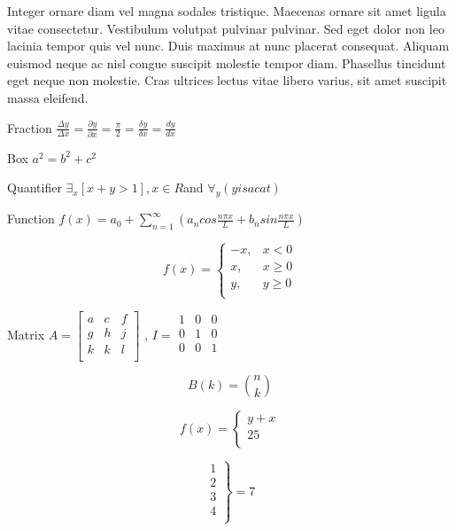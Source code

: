 \documentclass{book}
\begin{document}
Integer ornare diam vel magna sodales tristique. Maecenas ornare sit amet ligula vitae consectetur. Vestibulum volutpat pulvinar pulvinar. Sed eget dolor non leo lacinia tempor quis vel nunc. Duis maximus at nunc placerat consequat. Aliquam euismod neque ac nisl congue suscipit molestie tempor diam. Phasellus tincidunt eget neque non molestie. Cras ultrices lectus vitae libero varius, sit amet suscipit massa eleifend.

Fraction $\frac{\Delta y}{\Delta x}=\frac{\partial y}{\partial x}=\frac{\pi }{2}=\frac{\delta y}{\delta x}=\frac{dy}{dx}$

Box $\boxed {{a}^{2}={b}^{2}+{c}^{2}}$

Quantifier ${\exists }_{x}[x+y>1], x\in R$and  ${\forall }_{y}(y is a cat)$

Function $f(x)={a}_{0}+\sum _{n=1}^{\infty } ({a}_{n}cos\frac{n\pi x}{L}+{b}_{n}sin\frac{n\pi x}{L})$ 

$$f(x)=\left \{ \begin{array}{lr}
-x,  & x<0 \\
x,  & x\geq 0 \\
y,  & y\geq 0 \\
\end{array} \right.$$

Matrix $A=\begin{bmatrix}
 a & c & f \\
g & h & j \\
k & k & l \\
 \end{bmatrix}
$ , $I= \begin{matrix}
 1 & 0 & 0 \\
0 & 1 & 0 \\
0 & 0 & 1 \\
 \end{matrix}
$

$$B(k)={n \choose k}$$

$$f(x)=\left \{ \begin{array}{lr}
y+x \\
25 \\
\end{array} \right.$$

$$\left. \begin{array}{lr}
1 \\
2 \\
3 \\
4 \\
\end{array} \right \}=7$$
\end{document}
